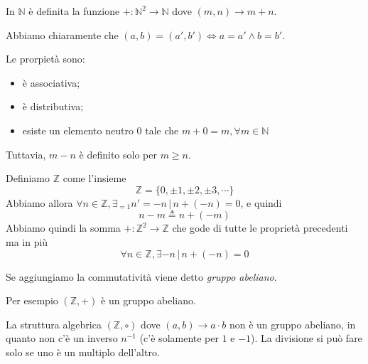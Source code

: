 \documentclass[a4paper]{article}
\begin{document}
In \(\mathbb{N}\) è definita la funzione \(+\colon {\mathbb{N}}^2 \to \mathbb{N}\)
dove \((m,n) \to m+n\).

Abbiamo chiaramente che \((a,b) = (a', b') \iff a=a' \land b=b'\).

Le prorpietà sono:
\begin{itemize}
    \item è associativa;
    \item è distributiva;
    \item esiste un elemento neutro \(0\) tale che \(m+0=m, \forall m \in \mathbb{N}\)
\end{itemize}

Tuttavia, \(m-n\) è definito solo per \(m \geq n\).

Definiamo \(\mathbb{Z}\) come l'insieme 
\[
    \mathbb{Z} = \{ 0, \pm 1, \pm 2, \pm 3, \cdots \}
\]
Abbiamo allora \(\forall n \in \mathbb{Z}, \exists_{=1} n'=-n \,|\, n+(-n) = 0\),
e quindi
\[
    n-m \triangleq n + (-m)
\]
Abbiamo quindi la somma \(+\colon {\mathbb{Z}}^2 \to \mathbb{Z}\)
che gode di tutte le proprietà precedenti ma in più 
\[
    \forall n \in \mathbb{Z}, \exists -n \,|\, n+(-n) = 0
\]


Se aggiungiamo la commutatività viene detto \textit{gruppo abeliano}.

Per esempio \((\mathbb{Z}, +)\) è un gruppo abeliano.

La struttura algebrica \((\mathbb{Z}, \circ)\) dove \((a,b) \to a\cdot b\) non è un gruppo abeliano,
in quanto non c'è un inverso \(n^{-1}\) (c'è solamente per \(1\) e \(-1\)).
La divisione si può fare solo se uno è un multiplo dell'altro.
\end{document}
